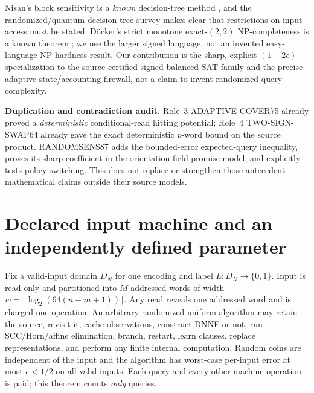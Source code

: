 \documentclass[11pt]{article}
\begin{document}
Nisan's block sensitivity is a \emph{known} decision-tree method \cite{nisan}, and the randomized/quantum decision-tree survey \cite{buhrman} makes clear that restrictions on input access must be stated. D\"ocker's strict monotone exact-$(2,2)$ NP-completeness is a known theorem \cite{docker}; we use the larger signed language, not an invented easy-language NP-hardness result. Our contribution is the sharp, explicit $(1-2\epsilon)$ specialization to the source-certified signed-balanced SAT family and the precise adaptive-state/accounting firewall, not a claim to invent randomized query complexity.

\noindent\textbf{Duplication and contradiction audit.}
Role~3 ADAPTIVE-COVER75 already proved a \emph{deterministic} conditional-read hitting potential; Role~4 TWO-SIGN-SWAP64 already gave the exact deterministic $p$-word bound on the source product. RANDOMSENS87 adds the bounded-error expected-query inequality, proves its sharp coefficient in the orientation-field promise model, and explicitly tests policy switching. This does not replace or strengthen those antecedent mathematical claims outside their source models.

\section{Declared input machine and an independently defined parameter}
Fix a valid-input domain $D_N$ for one encoding and label $L:D_N\to\{0,1\}$. Input is read-only and partitioned into $M$ addressed words of width $w=\lceil\log_2(64(n+m+1))\rceil$. Any read reveals one addressed word and is charged one operation. An arbitrary randomized uniform algorithm may retain the source, revisit it, cache observations, construct DNNF or not, run SCC/Horn/affine elimination, branch, restart, learn clauses, replace representations, and perform any finite internal computation. Random coins are independent of the input and the algorithm has worst-case per-input error at most $\epsilon<1/2$ on all valid inputs. Each query and every other machine operation is paid; this theorem counts \emph{only} queries.
\end{document}

